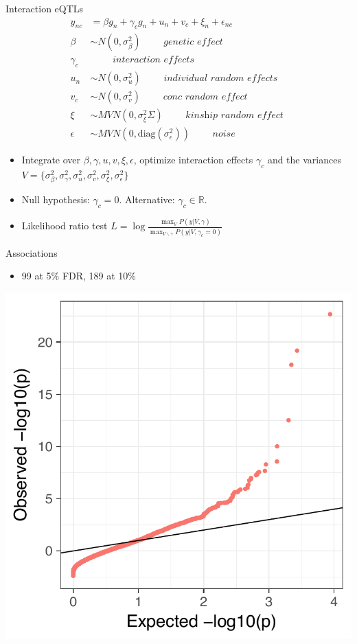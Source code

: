 \documentclass{beamer}
\begin{document}
\begin{frame}{Interaction eQTLs}
\begin{align*}
y_{nc} &= \beta g_n + \gamma_c g_n + u_n + v_c + \xi_n + \epsilon_{nc} \\
\beta &\sim N(0, \sigma^2_\beta ) \qquad \textit{ genetic effect }  \\
\gamma_c & \qquad \textit{ interaction effects }  \\
u_n &\sim N(0, \sigma^2_u) \qquad \textit{ individual random effects } \\
v_c &\sim N(0, \sigma^2_v)  \qquad \textit{ conc random effect } \\
\xi &\sim MVN(0, \sigma^2_\xi \Sigma ) \qquad \textit{ kinship random effect }  \\
\epsilon &\sim MVN(0, \text{diag}(\sigma^2_\epsilon)) \qquad \textit{ noise } 
\end{align*}
\begin{itemize}
\item Integrate over $\beta, \gamma, u, v, \xi, \epsilon$, optimize interaction effects $\gamma_c$ and the variances $V=\{ \sigma^2_\beta, \sigma^2_\gamma,  \sigma^2_u, \sigma^2_v,  \sigma^2_\xi, \sigma^2_\epsilon \}$
\item Null hypothesis: $\gamma_c = 0$. Alternative: $\gamma_c \in \mathbb{R}$.
\item Likelihood ratio test
$ L=\log\frac{ \max_V P( y | V, \gamma ) }{ \max_{V \backslash \gamma} P(y | V, \gamma_c=0 ) } $
\end{itemize}
\end{frame}

\begin{frame}{Associations}
\begin{itemize}
\item 99 at 5\% FDR, 189 at 10\%
\end{itemize}
\centering
\includegraphics[width=.5\textwidth,clip,trim=0 0 0 0]{../figures/lrt.pdf}
\end{frame}
\end{document}
